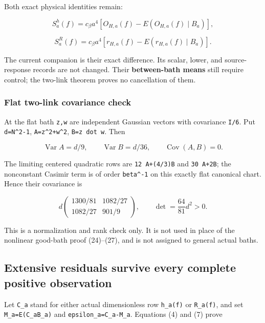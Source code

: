 \documentclass[
  11pt,
]{article}
\begin{document}
Both exact physical identities remain:

\[
 S_a^h(f)=c_\beta a^4[O_{H,a}(f)-E(O_{H,a}(f)\mid B_a)],
\]

\[
 S_a^R(f)=c_\beta a^4[r_{H,a}(f)-E(r_{H,a}(f)\mid B_a)].
 \tag{30}
\]

The current companion is their exact difference. Its scalar, lower, and
source-response records are not changed. Their \textbf{between-bath
means} still require control; the two-link theorem proves no
cancellation of them.

\hypertarget{flat-two-link-covariance-check}{%
\subsubsection{Flat two-link covariance
check}\label{flat-two-link-covariance-check}}

At the flat bath \texttt{z,w} are independent Gaussian vectors with
covariance \texttt{I/6}. Put \texttt{d=N\^{}2-1},
\texttt{A=\textbar{}z\textbar{}\^{}2+\textbar{}w\textbar{}\^{}2},
\texttt{B=z\ dot\ w}. Then

\[
 \operatorname{Var}A=d/9,\qquad\operatorname{Var}B=d/36,
 \qquad\operatorname{Cov}(A,B)=0.
\]

The limiting centered quadratic rows are \texttt{12\ A+(4/3)B} and
\texttt{30\ A+2B}; the nonconstant Casimir term is of order
\texttt{beta\^{}-1} on this exactly flat canonical chart. Hence their
covariance is

\[
 d\begin{pmatrix}1300/81&1082/27\\1082/27&901/9\end{pmatrix},
 \qquad \det=\frac{64}{81}d^2>0.
 \tag{31}
\]

This is a normalization and rank check only. It is not used in place of
the nonlinear good-bath proof (24)--(27), and is not assigned to general
actual baths.

\hypertarget{extensive-residuals-survive-every-complete-positive-observation}{%
\subsection{Extensive residuals survive every complete positive
observation}\label{extensive-residuals-survive-every-complete-positive-observation}}

Let \texttt{C\_a} stand for either actual dimensionless row
\texttt{h\_a(f)} or \texttt{R\_a(f)}, and set
\texttt{M\_a=E(C\_a\textbar{}B\_a)} and \texttt{epsilon\_a=C\_a-M\_a}.
Equations (4) and (7) prove
\end{document}
